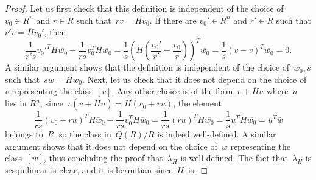 \documentclass[11pt,a4paper]{amsart}
\newcommand{\smargin}[1]{\marginpar{\tiny{#1}}}
\theoremstyle{definition}
\begin{document}
\begin{proof}
Let us first check that this definition is independent of the choice of~$v_0 \in R^n$ and $r \in R$ such that~$r v=\overline{H}v_0$. 
If there are $v_0' \in R^n$ and $r' \in R$ such that $r'v=\overline{H}v_0'$, then
$$ \frac{1}{r'\overline{s}}{v_0'}^T H\overline{w_0}-\frac{1}{r\overline{s}}v_0^T H\overline{w_0}
=\frac{1}{\overline{s}} \left( \overline{H}\left( \frac{v_0'}{r'}-\frac{v_0}{r} \right) \right)^T  \overline{w_0}
=\frac{1}{\overline{s}} \left( v-v \right)^T  \overline{w_0}=0.
$$
\color{black}
A similar argument shows that the definition is independent of the choice of~$w_0,s$ such that~$s w=\overline{H}w_0$. 
Next, let us check that it does not depend on the choice of~$v$ representing the class~$[v]$. 
Any other choice is of the form~$v+\overline{H}u$
where~$u$ lies in $R^n$; since~$r(v+\overline{H}u)=\overline{H}(v_0+r u)$, the element
$$ \frac{1}{r\overline{s}}(v_0+ru)^TH\overline{w}_0-\frac{1}{r\overline{s}}v_0^TH\overline{w}_0=\frac{1}{r\overline{s}}(r u)^TH\overline{w_0}=\frac{1}{\overline{s}}u^TH\overline{w_0}=u^T\overline{w} $$
belongs to~$R$, so the class in~$Q(R)/R$ is indeed well-defined. A similar argument shows that it does not depend on the choice of~$w$ representing the class~$[w]$, thus concluding the proof that~$\lambda_H$ is well-defined. The fact that~$\lambda_H$ is sesquilinear is clear, and it is hermitian since~$H$~is.


\end{proof}
\end{document}
